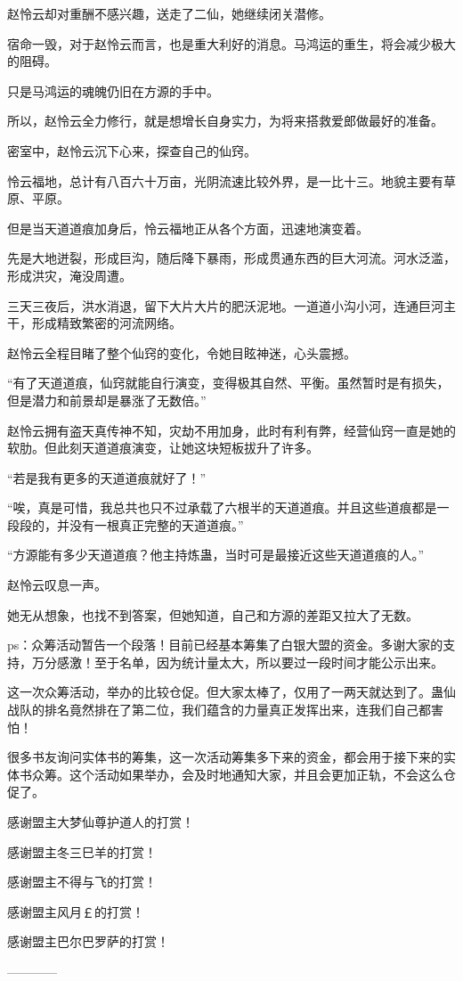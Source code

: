\begin{this_body}
赵怜云却对重酬不感兴趣，送走了二仙，她继续闭关潜修。

宿命一毁，对于赵怜云而言，也是重大利好的消息。马鸿运的重生，将会减少极大的阻碍。

只是马鸿运的魂魄仍旧在方源的手中。

所以，赵怜云全力修行，就是想增长自身实力，为将来搭救爱郎做最好的准备。

密室中，赵怜云沉下心来，探查自己的仙窍。

怜云福地，总计有八百六十万亩，光阴流速比较外界，是一比十三。地貌主要有草原、平原。

但是当天道道痕加身后，怜云福地正从各个方面，迅速地演变着。

先是大地迸裂，形成巨沟，随后降下暴雨，形成贯通东西的巨大河流。河水泛滥，形成洪灾，淹没周遭。

三天三夜后，洪水消退，留下大片大片的肥沃泥地。一道道小沟小河，连通巨河主干，形成精致繁密的河流网络。

赵怜云全程目睹了整个仙窍的变化，令她目眩神迷，心头震撼。

“有了天道道痕，仙窍就能自行演变，变得极其自然、平衡。虽然暂时是有损失，但是潜力和前景却是暴涨了无数倍。”

赵怜云拥有盗天真传神不知，灾劫不用加身，此时有利有弊，经营仙窍一直是她的软肋。但此刻天道道痕演变，让她这块短板拔升了许多。

“若是我有更多的天道道痕就好了！”

“唉，真是可惜，我总共也只不过承载了六根半的天道道痕。并且这些道痕都是一段段的，并没有一根真正完整的天道道痕。”

“方源能有多少天道道痕？他主持炼蛊，当时可是最接近这些天道道痕的人。”

赵怜云叹息一声。

她无从想象，也找不到答案，但她知道，自己和方源的差距又拉大了无数。

ps：众筹活动暂告一个段落！目前已经基本筹集了白银大盟的资金。多谢大家的支持，万分感激！至于名单，因为统计量太大，所以要过一段时间才能公示出来。

这一次众筹活动，举办的比较仓促。但大家太棒了，仅用了一两天就达到了。蛊仙战队的排名竟然排在了第二位，我们蕴含的力量真正发挥出来，连我们自己都害怕！

很多书友询问实体书的筹集，这一次活动筹集多下来的资金，都会用于接下来的实体书众筹。这个活动如果举办，会及时地通知大家，并且会更加正轨，不会这么仓促了。

感谢盟主大梦仙尊护道人的打赏！

感谢盟主冬三巳羊的打赏！

感谢盟主不得与飞的打赏！

感谢盟主风月￡的打赏！

感谢盟主巴尔巴罗萨的打赏！

------------

\end{this_body}

